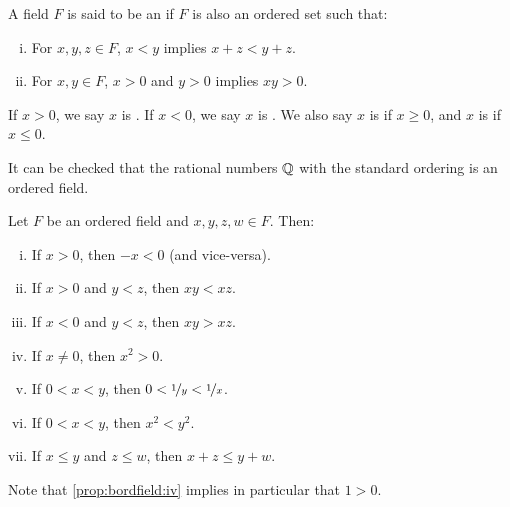 \begin{defn}
A field $F$ is said to be an \emph{} if
$F$ is also an ordered set such that:
\begin{enumerate}[(i)]
\item \label{defn:ordfield:i} For $x,y,z \in F$,  $x < y$ implies $x+z <
y+z$.
\item \label{defn:ordfield:ii} For $x,y \in F$, $x > 0$ and $y > 0$
implies $xy > 0$.
\end{enumerate}
If $x > 0$, we say $x$ is \emph{}.
If $x < 0$, we say $x$ is \emph{}.
We also say $x$ is \emph{} if $x \geq 0$,
and $x$ is \emph{} if $x \leq 0$.
\end{defn}

It can be checked that the rational numbers ${\mathbb{Q}}$ with the
standard ordering is an ordered field.

\begin{prop} \label{prop:bordfield}
Let $F$ be an ordered field and $x,y,z,w \in F$.  Then:
\begin{enumerate}[(i)]
\item \label{prop:bordfield:i} If $x > 0$, then $-x < 0$ (and vice-versa).
\item \label{prop:bordfield:ii} If $x > 0$ and $y < z$, then $xy < xz$.
\item \label{prop:bordfield:iii} If $x < 0$ and $y < z$, then $xy > xz$.
\item \label{prop:bordfield:iv} If $x \not= 0$, then $x^2 > 0$.
\item \label{prop:bordfield:v} If $0 < x < y$, then $0 < \nicefrac{1}{y} < \nicefrac{1}{x}$.
\item \label{prop:bordfield:vi} If $0 < x < y$, then $x^2 < y^2$.
\item \label{prop:bordfield:vii} If $x \leq y$ and $z \leq w$, then $x + z \leq y + w$.
\end{enumerate}
\end{prop}

Note that \ref{prop:bordfield:iv} implies in particular that $1 > 0$.


